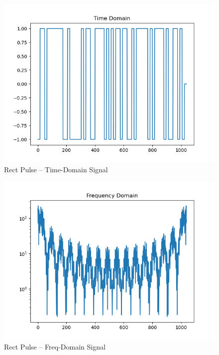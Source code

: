 \documentclass[
	letterpaper, %
	10pt, %
]{CSUniSchoolLabReport}
\begin{document}
\begin{figure}[H] %
	\centering %
	\includegraphics[width=1.2\textwidth]{assignment2a.png} %
	\caption{Rect Pulse -- Time-Domain Signal}
	\label{fig:block}
\end{figure}

\begin{figure}[H] %
	\centering %
	\includegraphics[width=1.2\textwidth]{assignment2b.png} %
	\caption{Rect Pulse -- Freq-Domain Signal}
	\label{fig:block}
\end{figure}
\end{document}
